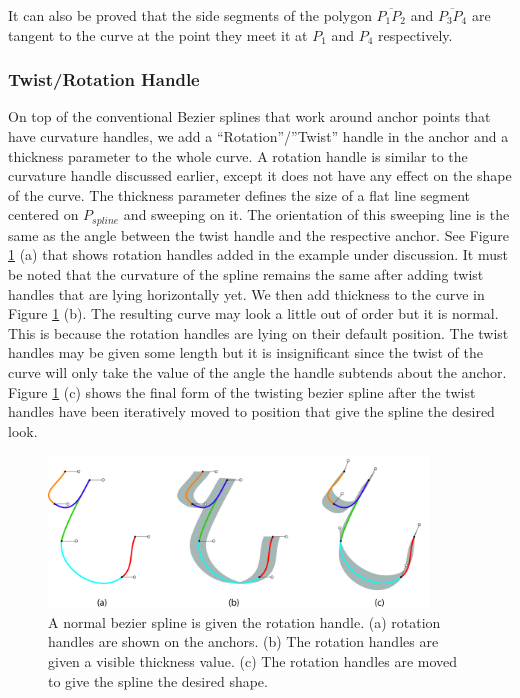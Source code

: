 It can also be proved that the side segments of the polygon $\overline{P_1 P_2}$ and $\overline{P_3 P_4}$ are tangent to the curve at the point they meet it at $P_1$ and $P_4$ respectively.


\subsubsection{Twist/Rotation Handle}
    On top of the conventional Bezier splines that work around anchor points that have curvature handles, we add a “Rotation”/”Twist” handle in the anchor and a thickness parameter to the whole curve. A rotation handle is similar to the curvature handle discussed earlier, except it does not have any effect on the shape of the curve. The thickness parameter defines the size of a flat line segment  centered on $P_{spline}$ and sweeping on it. The orientation of this sweeping line is the same as the angle between the twist handle and the respective anchor. See Figure \ref{Fig:RotatingBezierSplines} (a) that shows rotation handles added in the example under discussion. It must be noted that the curvature of the spline remains the same after adding twist handles that are lying horizontally yet. We then add thickness to the curve in Figure \ref{Fig:RotatingBezierSplines} (b). The resulting curve may look a little out of order but it is normal. This is because the rotation handles are lying on their default position. The twist handles may be given some length but it is insignificant since the twist of the curve will only take the value of the angle the handle subtends about the anchor. Figure \ref{Fig:RotatingBezierSplines} (c) shows the final form of the twisting bezier spline after the twist handles have been iteratively moved to position that give the spline the desired look.

        \begin{figure}
          \centering
          \includegraphics[width=0.9\textwidth]{../Images/AddingTwist_300PPI.jpg}
          \caption{A normal bezier spline is given the rotation handle. (a) rotation handles are shown on the anchors. (b) The rotation handles are given a visible thickness value. (c) The rotation handles are moved to give the spline the desired shape.
          } \label{Fig:RotatingBezierSplines}
        \end{figure}

